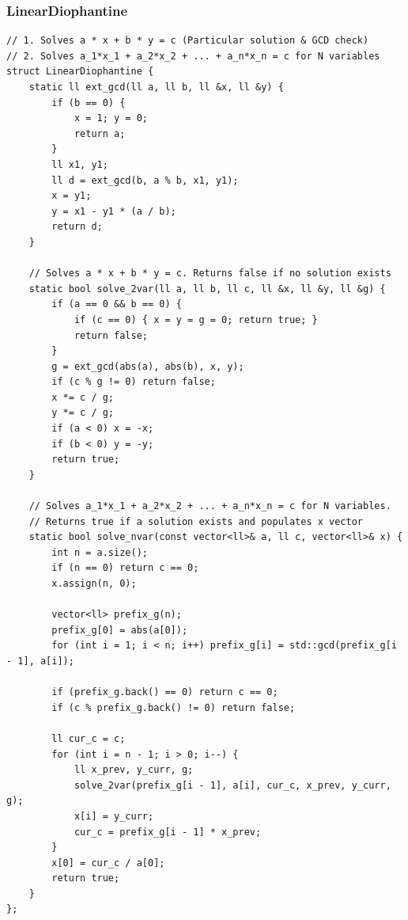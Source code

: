 \documentclass[9pt,a4paper,twocolumn]{extarticle}
\begin{document}
\subsubsection{LinearDiophantine}
\nopagebreak
\begin{lstlisting}
// 1. Solves a * x + b * y = c (Particular solution & GCD check)
// 2. Solves a_1*x_1 + a_2*x_2 + ... + a_n*x_n = c for N variables
struct LinearDiophantine {
    static ll ext_gcd(ll a, ll b, ll &x, ll &y) {
        if (b == 0) {
            x = 1; y = 0;
            return a;
        }
        ll x1, y1;
        ll d = ext_gcd(b, a % b, x1, y1);
        x = y1;
        y = x1 - y1 * (a / b);
        return d;
    }

    // Solves a * x + b * y = c. Returns false if no solution exists
    static bool solve_2var(ll a, ll b, ll c, ll &x, ll &y, ll &g) {
        if (a == 0 && b == 0) {
            if (c == 0) { x = y = g = 0; return true; }
            return false;
        }
        g = ext_gcd(abs(a), abs(b), x, y);
        if (c % g != 0) return false;
        x *= c / g;
        y *= c / g;
        if (a < 0) x = -x;
        if (b < 0) y = -y;
        return true;
    }

    // Solves a_1*x_1 + a_2*x_2 + ... + a_n*x_n = c for N variables.
    // Returns true if a solution exists and populates x vector
    static bool solve_nvar(const vector<ll>& a, ll c, vector<ll>& x) {
        int n = a.size();
        if (n == 0) return c == 0;
        x.assign(n, 0);

        vector<ll> prefix_g(n);
        prefix_g[0] = abs(a[0]);
        for (int i = 1; i < n; i++) prefix_g[i] = std::gcd(prefix_g[i - 1], a[i]);

        if (prefix_g.back() == 0) return c == 0;
        if (c % prefix_g.back() != 0) return false;

        ll cur_c = c;
        for (int i = n - 1; i > 0; i--) {
            ll x_prev, y_curr, g;
            solve_2var(prefix_g[i - 1], a[i], cur_c, x_prev, y_curr, g);
            x[i] = y_curr;
            cur_c = prefix_g[i - 1] * x_prev;
        }
        x[0] = cur_c / a[0];
        return true;
    }
};
\end{lstlisting}

\filbreak
\end{document}
